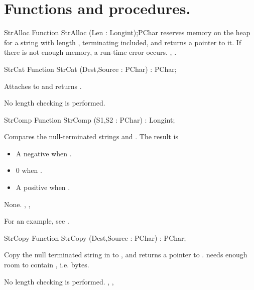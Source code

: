 \section{Functions and procedures.}
\begin{function}{StrAlloc}
\Declaration
Function StrAlloc (Len : Longint);PChar
\Description
{} reserves memory on the heap for a string with length ,
terminating  included, and returns a pointer to it.
\Errors
If there is not enough memory, a run-time error occurs.
\SeeAlso
{}, .
\end{function}
\begin{function}{StrCat}
\Declaration
Function StrCat (Dest,Source : PChar) : PChar;
\Description

Attaches  to  and returns .

\Errors
No length checking is performed.
\SeeAlso
{}
\end{function}
\latex{}
\html{}
\begin{function}{StrComp}
\Declaration
Function StrComp (S1,S2 : PChar) : Longint;

\Description

Compares the null-terminated strings  and .
The result is 
\begin{itemize}
\item A negative  when .
\item 0 when .
\item A positive  when .
\end{itemize}

\Errors
None.
\SeeAlso
{}, , 
\end{function}
For an example, see .
\begin{function}{StrCopy}
\Declaration
Function StrCopy (Dest,Source : PChar) : PChar;

\Description
 
Copy the null terminated string in  to , and
returns a pointer to .  needs enough room to contain
, i.e.  bytes.

\Errors
No length checking is performed.
\SeeAlso
 , , 
\end{function}
\latex{}
